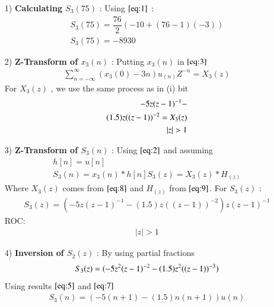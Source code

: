 \documentclass[journal,12pt,twocolumn]{IEEEtran}
\theoremstyle{remark}
\begin{document}
\begin{enumerate}
\item[1)]
\textbf{Calculating $S_3(75)$} :
Using $\eqref{eq:1}$ :\vspace{0.05cm}
\begin{align}
    S_3(75)=\dfrac{76}{2}(-10+(76-1)(-3))\\
   S_3(75)=-8930
    \end{align}

\item[2)] 
\textbf{Z-Transform of $x_3(n)$} :
Putting $x_3(n)$ in $\eqref{eq:3}$
\vspace{0.05cm}
\begin{align}
\sum_{n=-\infty}^{\infty}(x_3(0) -3n)u_{(n)}Z^{-n} =X_3(z)
\end{align}
For $X_3(z)$ , we use the same process as in (i) bit\vspace{0.05cm}
\begin{align}
  \notag -5z(z-1)^{-1}-\\
       (1.5)z((z-1))^{-2}=X_3(z) \label{eq:8}\\
           \lvert z\rvert  >  1 
\end{align}

    \vspace{0.7cm}
\item[3)]
\textbf{Z-Transform of $S_3(n)$} :
Using $\eqref{eq:2}$ and assuming 
\begin{align}
         h[n]=u[n] \\
    S_3(n) = x_3(n) * h[n] 
    S_3(z) = X_3(z) * H_(z)
    \end{align}
    Where $X_3(z)$ comes from $\eqref{eq:8}$ and $H_(z)$ from $\eqref{eq:9}$.
    \vspace{0.05cm}
    For $S_3(z)$ :
    \begin{align}
            S_3(z) = (-5z(z-1)^{-1}-
       (1.5)z((z-1))^{-2})z(z-1)^{-1}
    \end{align}
    ROC:
    \begin{align} 
    \lvert z \rvert > 1
    \end{align}
    
    \item[4)]
\textbf{Inversion of $S_2(z)$} :
By using partial fractions 
\begin{align}
    S_3(z) = \notag(-5z^2(z-1)^{-2} - (1.5)z^2((z-1))^{-3}) 
\end{align}
Using results $\eqref{eq:5}$ and $\eqref{eq:7}$
\begin{align}
 S_3(n) = (-5(n+1) - (1.5)n(n+1))u(n)   
\end{align}


\end{enumerate}
\end{document}
